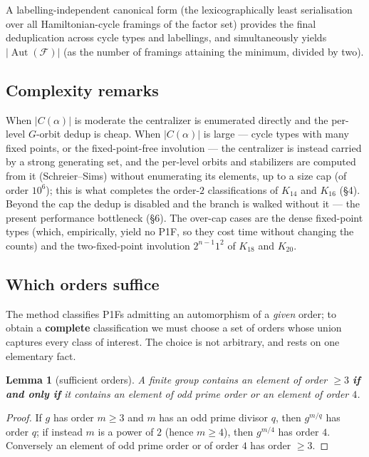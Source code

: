 \documentclass[11pt,reqno]{amsart}
\theoremstyle{plain}
\newtheorem{lemma}[theorem]{Lemma}
\theoremstyle{definition}
\numberwithin{theorem}{section}
\newcommand{\Aut}{\operatorname{Aut}}
\begin{document}
A labelling-independent canonical form (the lexicographically least serialisation
over all Hamiltonian-cycle framings of the factor set) provides the final
deduplication across cycle types and labellings, and simultaneously yields
$|\Aut(\mathcal F)|$ (as the number of framings attaining the minimum,
divided by two).

\subsection{Complexity remarks}

When $|C(\alpha)|$ is moderate the centralizer is enumerated directly and the per-level
$G$-orbit dedup is cheap. When $|C(\alpha)|$ is large --- cycle types with many fixed
points, or the fixed-point-free involution --- the centralizer is instead carried by a
strong generating set, and the per-level orbits and stabilizers are computed from it
(Schreier--Sims) without enumerating its elements, up to a size cap (of order $10^6$);
this is what completes the order-$2$ classifications of $K_{14}$ and $K_{16}$ (\S4).
Beyond the cap the dedup is disabled and the branch is walked without it --- the present
performance bottleneck (\S6). The over-cap cases are the dense fixed-point types (which,
empirically, yield no P1F, so they cost time without changing the counts) and the
two-fixed-point involution $2^{n-1}1^2$ of $K_{18}$ and $K_{20}$.

\subsection{Which orders suffice}

The method classifies P1Fs admitting an automorphism of a \emph{given} order; to obtain a
\textbf{complete} classification we must choose a set of orders whose union captures every
class of interest. The choice is not arbitrary, and rests on one elementary fact.

\begin{lemma}[sufficient orders]
A finite group contains an element of order $\ge 3$
\textbf{if and only if} it contains an element of odd prime order or an element of order
$4$.
\end{lemma}

\begin{proof}
If $g$ has order $m\ge3$ and $m$ has an odd prime divisor $q$, then $g^{m/q}$
has order $q$; if instead $m$ is a power of $2$ (hence $m\ge4$), then $g^{m/4}$ has
order $4$. Conversely an element of odd prime order or of order $4$ has order
$\ge3$.
\end{proof}
\end{document}
